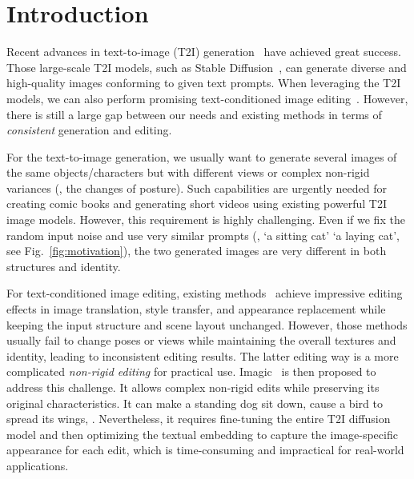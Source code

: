 \documentclass[10pt,twocolumn,letterpaper]{article}
\begin{document}
\section{Introduction}
Recent advances in text-to-image (T2I) generation~\cite{ramesh2021zero, nichol2021glide, yu2022parti, ramesh2022hierarchical, rombach2022high} have achieved great success. Those large-scale T2I models, such as Stable Diffusion~\cite{rombach2022high}, can generate diverse and high-quality images conforming to given text prompts. When leveraging the T2I models, we can also perform promising text-conditioned image editing~\cite{nichol2021glide, hertz2022prompt, tumanyan2022plug, parmar2023zero}. However, there is still a large gap between our needs and existing methods in terms of \textit{consistent} generation and editing.

For the text-to-image generation, we usually want to generate several images of the same objects/characters but with different views or complex non-rigid variances (\eg, the changes of posture). Such capabilities are urgently needed for creating comic books and generating short videos using existing powerful T2I image models. However, this requirement is highly challenging. Even if we fix the random input noise and use very similar prompts (\eg, `a sitting cat' \vs `a laying cat', see Fig.~\ref{fig:motivation}),  the two generated images are very different in both structures and identity.

 For text-conditioned image editing, existing methods~\cite{hertz2022prompt, tumanyan2022plug, parmar2023zero} achieve impressive editing effects in image translation, style transfer, and appearance replacement while keeping the input structure and scene layout unchanged. However, those methods usually fail to change poses or views while maintaining the overall textures and identity, leading to inconsistent editing results. The latter editing way is a more complicated \textit{non-rigid editing} for practical use.
Imagic~\cite{kawar2022imagic} is then proposed to address this challenge. It allows complex non-rigid edits while preserving its original characteristics. 
It can make a standing dog sit down, cause a bird to spread its wings, \etc.
Nevertheless, it requires fine-tuning the entire T2I diffusion model and then optimizing the textual embedding to capture the image-specific appearance for each edit, which is time-consuming and impractical for real-world applications.
\end{document}
